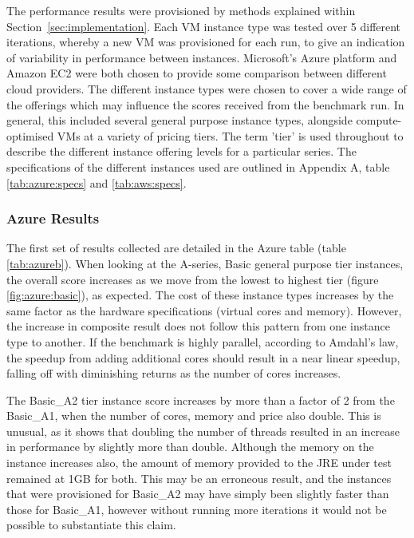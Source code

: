 \documentclass{entcs} \usepackage{entcsmacro}
\begin{document}
The performance results were provisioned by methods explained within Section~\ref{sec:implementation}. Each VM instance type was tested over 5 different iterations, whereby a new VM was provisioned for each run, to give an indication of variability in performance between instances. Microsoft's Azure platform and Amazon EC2 were both chosen to provide some comparison between different cloud providers. The different instance types were chosen to cover a wide range of the offerings which may influence the scores received from the benchmark run. In general, this included several general purpose instance types, alongside compute-optimised VMs at a variety of pricing tiers. The term 'tier' is used throughout to describe the different instance offering levels for a particular series. The specifications of the different instances used are outlined in Appendix A, table \ref{tab:azure:specs} and \ref{tab:aws:specs}.

\subsubsection{Azure Results}\label{sec:eval:azureresults}

The first set of results collected are detailed in the Azure table (table \ref{tab:azureb}). When looking at the A-series, Basic general purpose tier instances, the overall score increases as we move from the lowest to highest tier (figure \ref{fig:azure:basic}), as expected. The cost of these instance types increases by the same factor as the hardware specifications (virtual cores and memory). However, the increase in composite result does not follow this pattern from one instance type to another. If the benchmark is highly parallel, according to Amdahl's law, the speedup from adding additional cores should result in a near linear speedup, falling off with diminishing returns as the number of cores increases.

The Basic\_A2 tier instance score increases by more than a factor of 2 from the Basic\_A1, when the number of cores, memory and price also double. This is unusual, as it shows that doubling the number of threads resulted in an increase in performance by slightly more than double. Although the memory on the instance increases also, the amount of memory provided to the JRE under test remained at 1GB for both. This may be an erroneous result, and the instances that were provisioned for Basic\_A2 may have simply been slightly faster than those for Basic\_A1, however without running more iterations it would not be possible to substantiate this claim.
\end{document}
